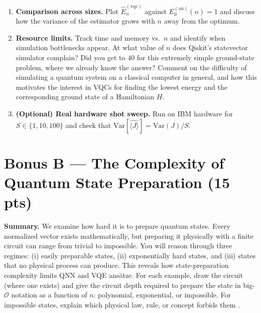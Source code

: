 \documentclass[11pt]{article}
\newenvironment{summary}{\par\noindent\textbf{Summary.} }{\par}
\begin{document}
\begin{enumerate}[label=(\alph*)]
Define $n^{(i)}_1 = \sum_{t=1}^S b_i^{(t)}$ as the number of shots in which qubit $i$ is measured in the state $\ket{1}$,
and $\hat{p}_i = n^{(i)}_1 / S$ as the corresponding empirical probability. Then, because expectation values are linear,
\[
\boxed{
\widehat{\langle J \rangle}
= \sum_{i=0}^{n-1} 2^{\,i}\,\hat{p}_i
= \sum_{i=0}^{n-1} 2^{\,i}\,\frac{n^{(i)}_1}{S}.
}
\]
This bitwise expression is equivalent to computing
\[
\widehat{\langle J\rangle}
=\frac{1}{S}\sum_{t=1}^{S} j^{(t)}
=\sum_{j=0}^{2^n-1} j\,\frac{c_j}{S},
\]
where $c_j$ is the number of times the outcome $j$ is observed among the $S$ shots.

\item \textbf{Comparison across sizes.}
Plot $\widehat{E}_n^{(\mathrm{vqe})}$ against $E_0^{(\mathrm{an})}(n)=1$ and discuss how the variance of the estimator grows with $n$ away from the optimum.

\item \textbf{Resource limits.}
Track time and memory vs.\ $n$ and identify when simulation bottlenecks appear. At what value of $n$ does Qiskit's statevector simulator complain? Did you get to $40$ \smiley{} for this extremely simple ground-state problem, where we already know the answer? Comment on the difficulty of simulating a quantum system on a classical computer in general, and how this motivates the interest in VQCs for finding the lowest energy and the corresponding ground state of a Hamiltonian $H$.

\item \textbf{(Optional) Real hardware shot sweep.}
Run on IBM hardware for $S\in\{1,10,100\}$ and check that $\mathrm{Var}[\widehat{\langle J\rangle}]=\mathrm{Var}(J)/S$.
\end{enumerate}

\newpage
\section*{Bonus B — The Complexity of Quantum State Preparation (15 pts)}

\begin{summary}
We examine how hard it is to prepare quantum states. Every normalized vector exists mathematically, but preparing it physically with a finite circuit can range from trivial to impossible. You will reason through three regimes: (i) easily preparable states, (ii) exponentially hard states, and (iii) states that no physical process can produce. This reveals how state-preparation complexity limits QNN and VQE ansätze. For each example, draw the circuit (where one exists) and give the circuit depth required to prepare the state in big-$\mathcal{O}$ notation as a function of $n$: polynomial, exponential, or impossible. For impossible states, explain which physical law, rule, or concept forbids them \smiley{}.
\end{summary}
\end{document}
